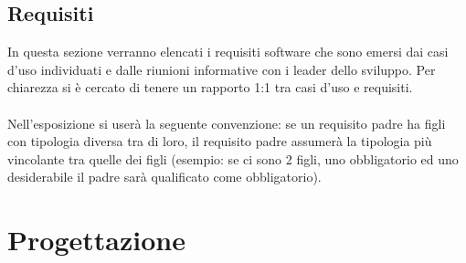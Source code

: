 \documentclass[a4paper,13pt,twoside]{article}
\begin{document}
\subsection{Requisiti} \label{sec:req}
In questa sezione verranno elencati i requisiti software che sono emersi dai casi d'uso individuati e dalle riunioni informative con i leader dello sviluppo. Per chiarezza si è cercato di tenere un rapporto 1:1 tra casi d'uso e requisiti.
 \\ \\Nell'esposizione si userà la seguente convenzione: se un requisito padre ha figli con tipologia diversa tra di loro, il requisito padre assumerà la tipologia più vincolante tra quelle dei figli (esempio: se ci sono 2 figli, uno obbligatorio ed uno desiderabile il padre sarà qualificato come obbligatorio).
 

\newpage

\newpage

\newpage

\section{Progettazione} \label{sec:progett}
\end{document}
